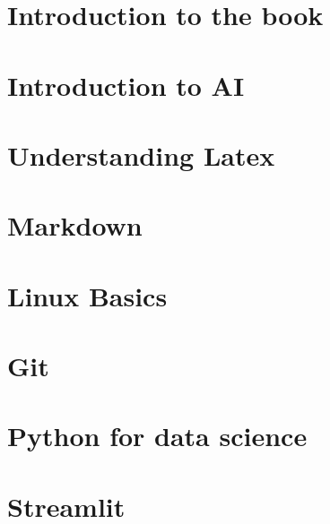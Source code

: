 \section{Introduction to the book}

\lipsum[1-7] %


\section{Introduction to AI}

\lipsum[1-7] %


\section{Understanding Latex}

\lipsum[1-7] %


\section{Markdown}

\lipsum[1-7] %


\section{Linux Basics}

\lipsum[1-7] %


\section{Git}

\lipsum[1-7] %


\section{Python for data science}

\lipsum[1-7] %



\section{Streamlit}

\lipsum[1-7] %

